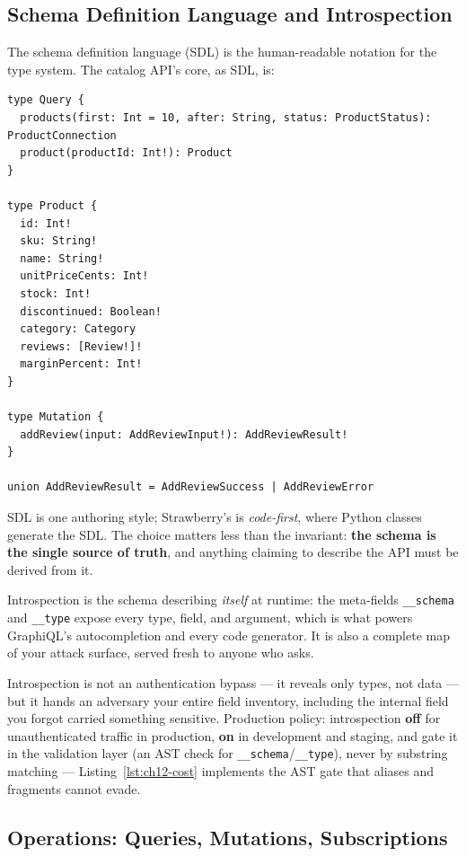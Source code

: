 \subsection{Schema Definition Language and Introspection}
\label{sec:ch12-sdl}

The schema definition language (SDL) is the human-readable notation for
the type system. The catalog API's core, as SDL, is:

\begin{verbatim}
type Query {
  products(first: Int = 10, after: String, status: ProductStatus): ProductConnection
  product(productId: Int!): Product
}

type Product {
  id: Int!
  sku: String!
  name: String!
  unitPriceCents: Int!
  stock: Int!
  discontinued: Boolean!
  category: Category
  reviews: [Review!]!
  marginPercent: Int!
}

type Mutation {
  addReview(input: AddReviewInput!): AddReviewResult!
}

union AddReviewResult = AddReviewSuccess | AddReviewError
\end{verbatim}

SDL is one authoring style; Strawberry's is \emph{code-first}, where Python
classes generate the SDL. The choice matters less than the invariant:
\textbf{the schema is the single source of truth}, and anything claiming
to describe the API must be derived from it.

Introspection is the schema describing \emph{itself} at runtime: the
meta-fields \texttt{\_\_schema} and \texttt{\_\_type} expose every type,
field, and argument, which is what powers GraphiQL's autocompletion and
every code generator. It is also a complete map of your attack surface,
served fresh to anyone who asks.

\begin{warningbox}
Introspection is not an authentication bypass --- it reveals only types,
not data --- but it hands an adversary your entire field inventory,
including the internal field you forgot carried something sensitive.
Production policy: introspection \textbf{off} for unauthenticated traffic
in production, \textbf{on} in development and staging, and gate it in the
validation layer (an AST check for \texttt{\_\_schema}/\texttt{\_\_type}),
never by substring matching --- Listing~\ref{lst:ch12-cost} implements the
AST gate that aliases and fragments cannot evade.
\end{warningbox}

\subsection{Operations: Queries, Mutations, Subscriptions}
\label{sec:ch12-operations}

